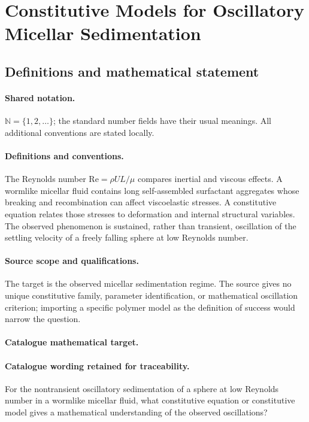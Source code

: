 \documentclass[11pt]{article}
\begin{document}
\section{Constitutive Models for Oscillatory Micellar Sedimentation}\label{statement}

\subsection{Definitions and mathematical statement}

\paragraph{Shared notation.}$\mathbb N=\{1,2,\ldots\}$; the standard number fields have their usual meanings. All additional conventions are stated locally.


\paragraph{Definitions and conventions.} The Reynolds number $\mathrm{Re}=\rho UL/\mu$ compares inertial and viscous effects. A wormlike micellar fluid contains long self-assembled surfactant aggregates whose breaking and recombination can affect viscoelastic stresses. A constitutive equation relates those stresses to deformation and internal structural variables. The observed phenomenon is sustained, rather than transient, oscillation of the settling velocity of a freely falling sphere at low Reynolds number.

\paragraph{Source scope and qualifications.} The target is the observed micellar sedimentation regime. The source gives no unique constitutive family, parameter identification, or mathematical oscillation criterion; importing a specific polymer model as the definition of success would narrow the question.

\paragraph{Catalogue mathematical target.}
\paragraph{Catalogue wording retained for traceability.}
For the nontransient oscillatory sedimentation of a sphere at low Reynolds number in a wormlike micellar fluid, what constitutive equation or constitutive model gives a mathematical understanding of the observed oscillations?
\end{document}
